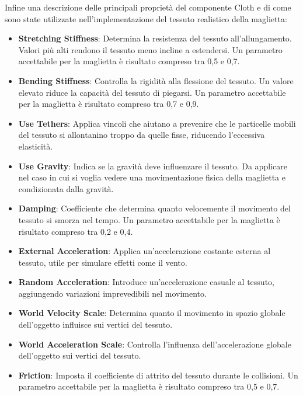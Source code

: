 \documentclass[11pt]{report}
\begin{document}
Infine una descrizione delle principali proprietà del componente Cloth e di come sono state utilizzate nell'implementazione del tessuto realistico della maglietta:
\begin{itemize}
    \item \textbf{Stretching Stiffness}: Determina la resistenza del tessuto all'allungamento. Valori più alti rendono il tessuto meno incline a estendersi. Un parametro accettabile per la maglietta è risultato compreso tra 0,5 e 0,7.

    \item \textbf{Bending Stiffness}: Controlla la rigidità alla flessione del tessuto. Un valore elevato riduce la capacità del tessuto di piegarsi. Un parametro accettabile per la maglietta è risultato compreso tra 0,7 e 0,9.

    
    \item \textbf{Use Tethers}: Applica vincoli che aiutano a prevenire che le particelle mobili del tessuto si allontanino troppo da quelle fisse, riducendo l'eccessiva elasticità.
    
    \item \textbf{Use Gravity}: Indica se la gravità deve influenzare il tessuto. Da applicare nel caso in cui si voglia vedere una movimentazione fisica della maglietta e condizionata dalla gravità.
    
    \item \textbf{Damping}: Coefficiente che determina quanto velocemente il movimento del tessuto si smorza nel tempo.  Un parametro accettabile per la maglietta è risultato compreso tra 0,2 e 0,4.
    
    \item \textbf{External Acceleration}: Applica un'accelerazione costante esterna al tessuto, utile per simulare effetti come il vento.
    
    \item \textbf{Random Acceleration}: Introduce un'accelerazione casuale al tessuto, aggiungendo variazioni imprevedibili nel movimento.
    
    \item \textbf{World Velocity Scale}: Determina quanto il movimento in spazio globale dell'oggetto influisce sui vertici del tessuto.
    
    \item \textbf{World Acceleration Scale}: Controlla l'influenza dell'accelerazione globale dell'oggetto sui vertici del tessuto.
    
    \item \textbf{Friction}: Imposta il coefficiente di attrito del tessuto durante le collisioni.  Un parametro accettabile per la maglietta è risultato compreso tra 0,5 e 0,7.
    

\end{itemize}
\end{document}
